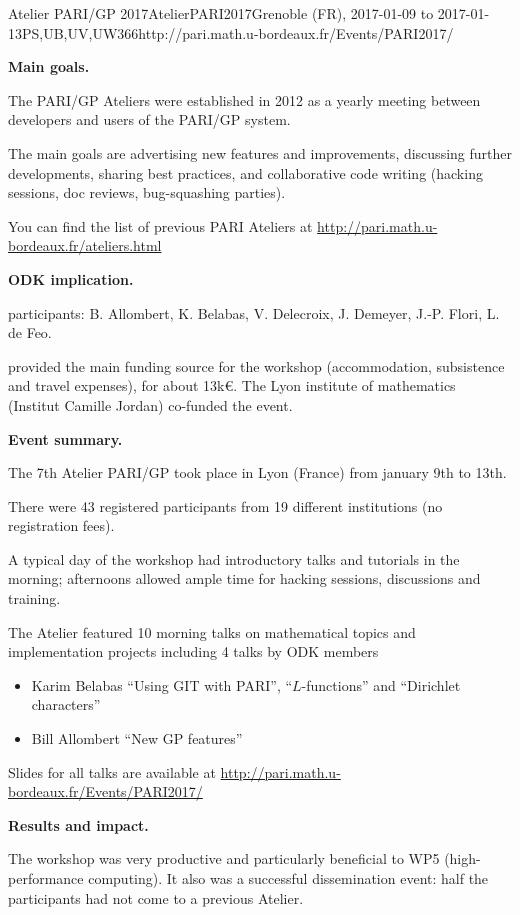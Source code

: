 \begin{event}{Atelier PARI/GP 2017}{AtelierPARI2017}{Grenoble (FR),
2017-01-09 to 2017-01-13}{PS,UB,UV,UW}{36}{6}{http://pari.math.u-bordeaux.fr/Events/PARI2017/}

\textbf{Main goals.}

The PARI/GP Ateliers were established in 2012 as a yearly meeting
between developers and users of the PARI/GP system.

The main goals are advertising new features and improvements,
discussing further developments, sharing best practices, and collaborative
code writing (hacking sessions, doc reviews, bug-squashing parties).

You can find the list of previous PARI Ateliers at
\url{http://pari.math.u-bordeaux.fr/ateliers.html}

\textbf{ODK implication.} 

\ODK participants: B. Allombert, K. Belabas, V. Delecroix, J. Demeyer,
J.-P. Flori, L. de Feo.

\ODK provided the main funding source for the workshop (accommodation,
subsistence and travel expenses), for about 13k\euro. The Lyon
institute of mathematics (Institut Camille Jordan) co-funded the event.

\textbf{Event summary.} 

The 7th Atelier PARI/GP took place in Lyon (France) from january
9th to 13th.

There were 43 registered participants from 19 different institutions
(no registration fees).

A typical day of the workshop had introductory talks and tutorials
in the morning; afternoons allowed ample time for hacking sessions,
discussions and training.

The Atelier featured 10 morning talks on mathematical topics and
implementation projects including 4 talks by ODK members
\begin{itemize}
\item Karim Belabas ``Using GIT with PARI'', ``$L$-functions'' and
  ``Dirichlet characters''
\item Bill Allombert ``New GP features''
\end{itemize}

Slides for all talks are available at
\url{http://pari.math.u-bordeaux.fr/Events/PARI2017/}

\textbf{Results and impact.} 

The workshop was very productive and particularly beneficial to WP5
(high-performance computing). It also was a successful dissemination event: half
  the participants had not come to a previous Atelier.

\end{event}
